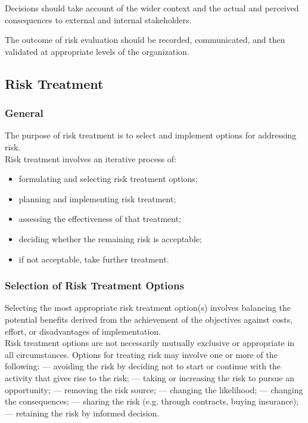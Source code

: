 \documentclass[letterpaper,10pt,english]{jupyterBook}
\begin{document}
\sphinxAtStartPar
Decisions should take account of the wider context and the actual and perceived consequences to external and internal stakeholders.

\sphinxAtStartPar
The outcome of risk evaluation should be recorded, communicated, and then validated at appropriate levels of the organization.


\subsection{Risk Treatment}
\label{\detokenize{PM/rm:risk-treatment}}

\subsubsection{General}
\label{\detokenize{PM/rm:id3}}
\sphinxAtStartPar
The purpose of risk treatment is to select and implement options for addressing risk. \\
Risk treatment involves an iterative process of:
\begin{itemize}
\item {} 
\sphinxAtStartPar
formulating and selecting risk treatment options;

\item {} 
\sphinxAtStartPar
planning and implementing risk treatment;

\item {} 
\sphinxAtStartPar
assessing the effectiveness of that treatment;

\item {} 
\sphinxAtStartPar
deciding whether the remaining risk is acceptable;

\item {} 
\sphinxAtStartPar
if not acceptable, take further treatment.

\end{itemize}


\subsubsection{Selection of Risk Treatment Options}
\label{\detokenize{PM/rm:selection-of-risk-treatment-options}}
\sphinxAtStartPar
Selecting the most appropriate risk treatment option(s) involves balancing the potential benefits derived from the achievement of the objectives against costs, effort, or disadvantages of implementation. \\
Risk treatment options are not necessarily mutually exclusive or appropriate in all circumstances. Options for treating risk may involve one or more of the following:
— avoiding the risk by deciding not to start or continue with the activity that gives rise to the risk;
— taking or increasing the risk to pursue an opportunity;
— removing the risk source;
— changing the likelihood;
— changing the consequences;
— sharing the risk (e.g. through contracts, buying insurance);
— retaining the risk by informed decision.
\end{document}
